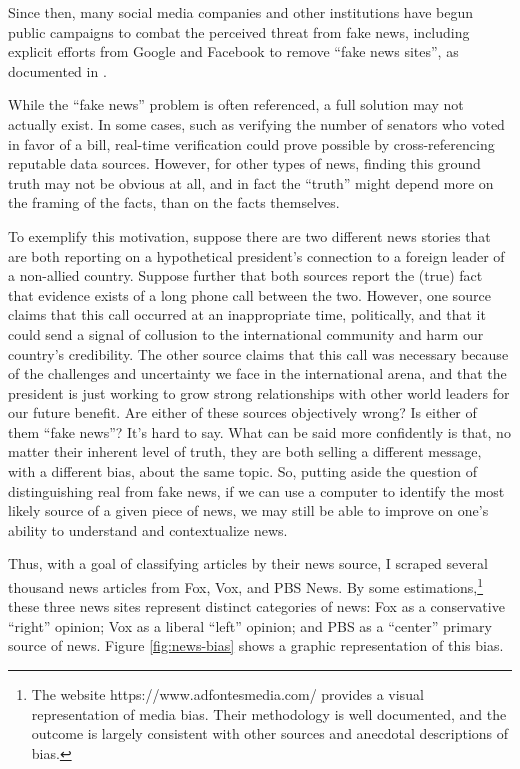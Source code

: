 \documentclass{article}
\begin{document}
		Since then, many social media companies and other institutions have begun public campaigns to combat the perceived threat from fake news, including explicit efforts from Google and Facebook to remove ``fake news sites'', as documented in \citet{allcott2017social}. 
		
		While the ``fake news'' problem is often referenced, a full solution may not actually exist. In some cases, such as verifying the number of senators who voted in favor of a bill, real-time verification could prove possible by cross-referencing reputable data sources. However, for other types of news, finding this ground truth may not be obvious at all, and in fact the ``truth'' might  depend more on the framing of the facts, than on the facts themselves. 
		
		To exemplify this motivation, suppose there are two different news stories that are both reporting on a hypothetical president's connection to a foreign leader of a non-allied country. Suppose further that both sources report the (true) fact that evidence exists of a long phone call between the two. However, one source claims that this call occurred at an inappropriate time, politically, and that it could send a signal of collusion to the international community and harm our country's credibility. The other source claims that this call was necessary because of the challenges and uncertainty we face in the international arena, and that the president is just working to grow strong relationships with other world leaders for our future benefit. Are either of these sources objectively wrong? Is either of them ``fake news''? It's hard to say. What can be said more confidently is that, no matter their inherent level of truth, they are both selling a different message, with a different bias, about the same topic. So, putting aside the question of distinguishing real from fake news, if we can use a computer to identify the most likely source of a given piece of news, we may still be able to improve on one's ability to understand and contextualize news. 
		
		Thus, with a goal of classifying articles by their news source, I scraped several thousand news articles from Fox, Vox, and PBS News. By some estimations,\footnote{The website https://www.adfontesmedia.com/ provides a visual representation of media bias. Their methodology is well documented, and the outcome is largely consistent with other sources and anecdotal descriptions of bias.} these three news sites represent distinct categories of news: Fox as a conservative “right” opinion; Vox as a liberal “left” opinion; and PBS as a “center” primary source of news. Figure \ref{fig:news-bias} shows a graphic representation of this bias. 
		
\end{document}
